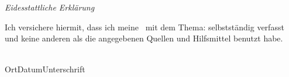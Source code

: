 

\newpage
\thispagestyle{empty}
\begin{center}
\Huge\emph{Eidesstattliche Erklärung}
\end{center}
\medskip
\noindent
Ich versichere hiermit, dass ich meine \Titel\ mit
dem Thema: \glqq \Was \grqq{ }selbstständig verfasst und keine anderen als die angegebenen Quellen und Hilfsmittel benutzt habe.

\vspace{3cm}
\noindent
\underline{\hspace{6cm}}\hfill\underline{\hspace{6cm}}\\
Ort\hspace{2.5cm}Datum\hfill Unterschrift\hspace{3.8cm}

\vfill

\endinput
